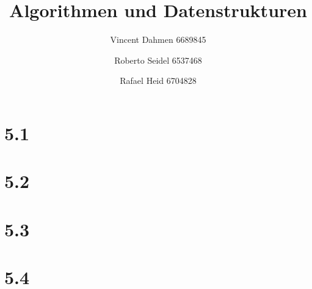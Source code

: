 \documentclass[12pt,a4paper]{article}
\title{Algorithmen und Datenstrukturen}
\author{Vincent Dahmen 6689845 \and Roberto Seidel 6537468 \and Rafael Heid 6704828}
\begin{document}
\maketitle{}


\section*{5.1}


\section*{5.2}


\section*{5.3}

\newpage
\section*{5.4}

\end{document}
